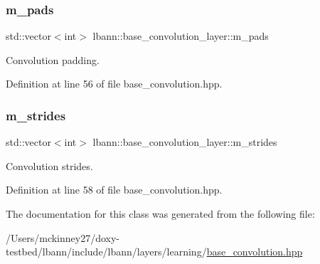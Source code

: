 \subsubsection{\texorpdfstring{m\+\_\+pads}{m\_pads}}
{\footnotesize\ttfamily std\+::vector$<$int$>$ lbann\+::base\+\_\+convolution\+\_\+layer\+::m\+\_\+pads\hspace{0.3cm}{\ttfamily [protected]}}

Convolution padding. 

Definition at line 56 of file base\+\_\+convolution.\+hpp.

\mbox{\label{classlbann_1_1base__convolution__layer_a2429495822363e41f1f6b96a6b430445}} 
\subsubsection{\texorpdfstring{m\+\_\+strides}{m\_strides}}
{\footnotesize\ttfamily std\+::vector$<$int$>$ lbann\+::base\+\_\+convolution\+\_\+layer\+::m\+\_\+strides\hspace{0.3cm}{\ttfamily [protected]}}

Convolution strides. 

Definition at line 58 of file base\+\_\+convolution.\+hpp.



The documentation for this class was generated from the following file\+:\begin{DoxyCompactItemize}
\item 
/\+Users/mckinney27/doxy-\/testbed/lbann/include/lbann/layers/learning/\hyperlink{base__convolution_8hpp}{base\+\_\+convolution.\+hpp}\end{DoxyCompactItemize}
